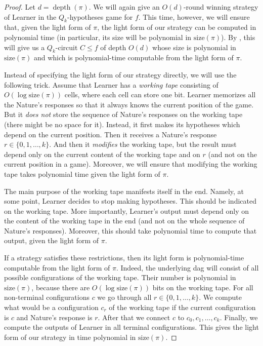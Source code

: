 \documentclass{toc}
\DeclareMathOperator{\depth}{depth}  %
\begin{document}
\begin{proof}
Let $d = \depth(\pi)$.
We will again give an $O(d)$-round winning strategy of Learner in the $Q_k$-hypotheses game for $f$. This time, however, we will ensure that, given the light form of $\pi$, the light form of our strategy can be computed in polynomial time (in particular, its size will be polynomial in $\mathrm{size}(\pi)$). By , this will give us
%
a $Q_k$-circuit $C\le f$
of depth $O(d)$  %
whose size is polynomial in $\mathrm{size}(\pi)$ and which is polynomial-time computable from the light form of $\pi$.

Instead of specifying the light form of our strategy directly, we will use the following trick. Assume that Learner has a \emph{working tape} consisting of $O(\log \mathrm{size}(\pi))$ cells, where each cell can store one bit. Learner memorizes all the Nature's responses so that it %
 always knows the current position of the game. 
 But it %
 \emph{does not} store the sequence of Nature's responses on the working tape (there might be no space for it). 
Instead, it %
 first makes its %
hypotheses which depend on the current position. 
Then it %
 receives a Nature's response $r\in \{0, 1, \ldots, k\}$. 
And then it %
 \emph{modifies} the working tape, but the result must depend only on the current content of the working tape and on $r$ (and not on the current position in a game). 
Moreover, we will ensure that modifying the working tape takes  polynomial time given the light form of $\pi$.  

The main purpose of the working tape manifests itself in the end. Namely, at some point, Learner decides to stop making hypotheses. This should be indicated on the working tape. More importantly, Learner's output must depend only on the content of the working tape in the end (and not on the whole sequence of Nature's responses). Moreover, this should take polynomial time to compute that output, given the light form of $\pi$. 

If a strategy satisfies these restrictions, then its light form is polynomial-time computable from the light form of $\pi$. Indeed, the underlying dag will consist of all possible configurations of the working tape. Their number is polynomial in $\mathrm{size}(\pi)$, because there are $O(\log \mathrm{size}(\pi))$ bits on the working tape. For all non-terminal configurations $c$ we go through all $r\in\{0, 1, \ldots, k\}$. We compute what would be a configuration $c_r$ of the working tape if the current configuration is $c$ and Nature's response is $r$. After that we connect $c$ to $c_0, c_1, \ldots, c_k$. Finally, we compute the outputs of Learner in all terminal configurations. This gives the light form of our strategy in time polynomial in $\mathrm{size}(\pi)$.


\end{proof}
\end{document}
